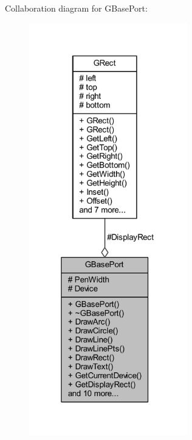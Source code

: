 Collaboration diagram for G\+Base\+Port\+:\nopagebreak
\begin{figure}[H]
\begin{center}
\leavevmode
\includegraphics[width=195pt]{class_g_base_port__coll__graph}
\end{center}
\end{figure}
